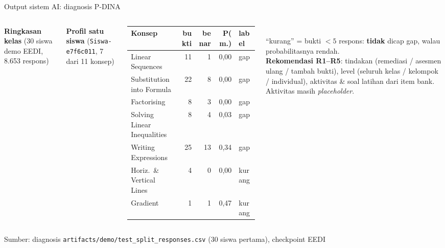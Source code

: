 \documentclass[aspectratio=169,10pt]{beamer}
\newcommand{\src}[1]{\par\vfill{\tiny\color{midgray}Sumber: #1}}
\begin{document}
\begin{frame}{Output sistem AI: diagnosis P-DINA}
  \begin{columns}[T]
    \footnotesize
    \textbf{Ringkasan kelas} (30 siswa demo EEDI, 8.653 respons)
    \setlength\figH{4.5cm}
    
    \footnotesize
    \textbf{Profil satu siswa} (\texttt{Siswa-e7f6c011}, 7 dari 11 konsep)\\[3pt]
    \scriptsize
    \setlength\tabcolsep{4pt}
    \begin{tabular}{@{}l r r r l@{}}
      \toprule
      Konsep & bukti & benar & P(m.) & label \\
      \midrule
      Linear Sequences & 11 & 1 & 0,00 & gap \\
      Substitution into Formula & 22 & 8 & 0,00 & gap \\
      Factorising & 8 & 3 & 0,00 & gap \\
      Solving Linear Inequalities & 8 & 4 & 0,03 & gap \\
      Writing Expressions & 25 & 13 & 0,34 & gap \\
      Horiz.\ \& Vertical Lines & 4 & 0 & 0,00 & kurang \\
      Gradient & 1 & 1 & 0,47 & kurang \\
      \bottomrule
    \end{tabular}\\[4pt]
    \footnotesize
    ``kurang'' = bukti $<5$ respons: \textbf{tidak} dicap gap, walau probabilitasnya rendah.\\[4pt]
    \textbf{Rekomendasi R1--R5}: tindakan (remediasi / asesmen ulang / tambah bukti), level (seluruh kelas /
    kelompok / individual), aktivitas \& soal latihan dari item bank. Aktivitas masih \emph{placeholder}.
  \end{columns}
  \src{diagnosis \texttt{artifacts/demo/test\_split\_responses.csv} (30 siswa pertama), checkpoint EEDI}
\end{frame}
\end{document}
